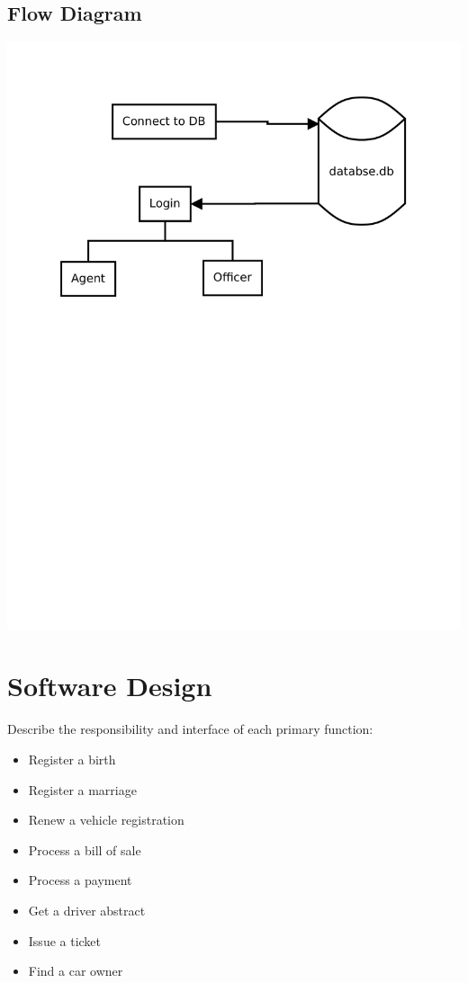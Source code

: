\documentclass[10pt, a4paper]{article}
\begin{document}
{\subsection{Flow Diagram}
\begin{center}
\includegraphics[width=\textwidth]{Diagram1.pdf}
\end{center}

\newpage
\section{Software Design}\label{SD}
Describe the responsibility and interface of each primary function:
\begin{itemize}
\item Register a birth
\item Register a marriage
\item Renew a vehicle registration
\item Process a bill of sale
\item Process a payment
\item Get a driver abstract
\item Issue a ticket
\item Find a car owner
\end{itemize}

}
\end{document}
